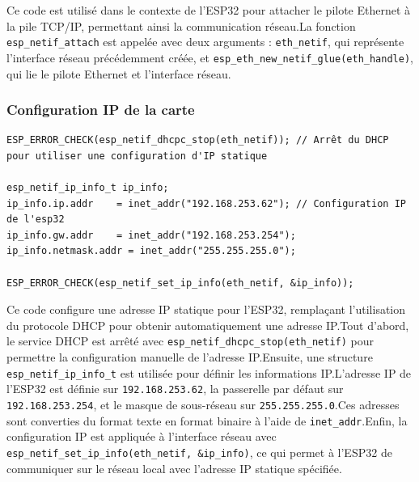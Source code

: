 \documentclass[a4paper,11pt]{article}
\begin{document}
        \vspace{0.5cm}
        Ce code est utilisé dans le contexte de l'ESP32 pour attacher le pilote Ethernet à la pile TCP/IP, permettant ainsi la communication réseau.\newline La fonction \texttt{esp\_netif\_attach} est appelée avec deux arguments : \texttt{eth\_netif}, qui représente l'interface réseau précédemment créée, et \newline \texttt{esp\_eth\_new\_netif\_glue(eth\_handle)}, qui lie le pilote Ethernet et l'interface réseau.\newline

        \newpage
        \subsubsection{Configuration IP de la carte}
        \begin{lstlisting}[style=C, caption={Configuration IP de la carte}]
ESP_ERROR_CHECK(esp_netif_dhcpc_stop(eth_netif)); // Arrêt du DHCP pour utiliser une configuration d'IP statique

esp_netif_ip_info_t ip_info;
ip_info.ip.addr    = inet_addr("192.168.253.62"); // Configuration IP de l'esp32
ip_info.gw.addr    = inet_addr("192.168.253.254");
ip_info.netmask.addr = inet_addr("255.255.255.0");

ESP_ERROR_CHECK(esp_netif_set_ip_info(eth_netif, &ip_info));
        \end{lstlisting}

        \vspace{0.5cm}
        Ce code configure une adresse IP statique pour l'ESP32, remplaçant l'utilisation du protocole DHCP pour obtenir automatiquement une adresse IP.\newline Tout d'abord, le service DHCP est arrêté avec \texttt{esp\_netif\_dhcpc\_stop(eth\_netif)} pour permettre la configuration manuelle de l'adresse IP.\newline Ensuite, une structure \texttt{esp\_netif\_ip\_info\_t} est utilisée pour définir les informations IP.\newline L'adresse IP de l'ESP32 est définie sur \texttt{192.168.253.62}, la passerelle par défaut sur \texttt{192.168.253.254}, et le masque de sous-réseau sur \texttt{255.255.255.0}.\newline Ces adresses sont converties du format texte en format binaire à l'aide de \texttt{inet\_addr}.\newline Enfin, la configuration IP est appliquée à l'interface réseau avec \newline \texttt{esp\_netif\_set\_ip\_info(eth\_netif, \&ip\_info)}, ce qui permet à l'ESP32 de communiquer sur le réseau local avec l'adresse IP statique spécifiée.\newline
\end{document}
